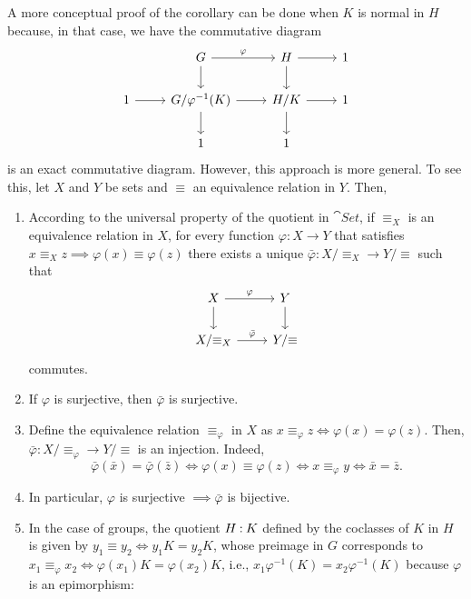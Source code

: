 \begin{rem}\label{rem:bijective-coclasses}
    A more conceptual proof of the corollary can be done when $K$ is normal in $H$ because, in that case, we have the commutative diagram
    \small
    $$
        \begin{tikzcd}
            &G\arrow[r,"\varphi"]\arrow[d]&H\arrow[r]\arrow[d]&1\\
            1\arrow[r]&G/\varphi^{-1}(K)\arrow[r]\arrow[d]
                &H/K\arrow[r]\arrow[d]&1\\
                &1&1
        \end{tikzcd}
    $$
    \normalsize
    is an exact commutative diagram. However, this approach is more general. To see this, let $X$ and $Y$ be sets and $\equiv$ an equivalence relation in $Y$. Then,
    \begin{enumerate}[-]
        \item According to the universal property of the quotient in $\cat{Set}$, if $\equiv_X$ is an equivalence relation in $X$, for every function $\varphi\colon X\to Y$ that satisfies $x\equiv_X z\implies\varphi(x)\equiv\varphi(z)$ there exists a unique $\bar\varphi\colon X/{\equiv_X}\to Y/{\equiv}$ such that
        $$
            \begin{tikzcd}
                X
                        \arrow[r,"\varphi"]
                        \arrow[d]
                    &Y
                        \arrow[d]\\
                X/{\equiv_X}
                        \arrow[r,"\bar\varphi"]
                    &Y/{\equiv}
            \end{tikzcd}
        $$
        commutes.
        \item If $\varphi$ is surjective, then $\bar\varphi$ is surjective.
        \item Define the equivalence relation $\equiv_\varphi$ in $X$ as $x\equiv_\varphi z\iff\varphi(x)=\varphi(z)$. Then, $\bar \varphi\colon X/{\equiv_\varphi}\to Y/{\equiv}$ is an injection. Indeed,
        $$
            \bar\varphi(\bar x)=\bar\varphi(\bar z)\iff\varphi(x)\equiv\varphi(z)
                \iff x\equiv_\varphi y
                \iff \bar x=\bar z.
        $$
        \item In particular, $\varphi$ is surjective $\implies\bar\varphi$ is bijective.
        \item In the case of groups, the quotient $H\mathbin:K$ defined by the coclasses of $K$ in $H$ is given by $y_1\equiv y_2\iff y_1K=y_2K$, whose preimage in $G$ corresponds to $x_1\equiv_\varphi x_2\iff \varphi(x_1)K=\varphi(x_2)K$, i.e., $x_1\varphi^{-1}(K)=x_2\varphi^{-1}(K)$ because $\varphi$ is an epimorphism:

\end{enumerate}
\end{rem}
